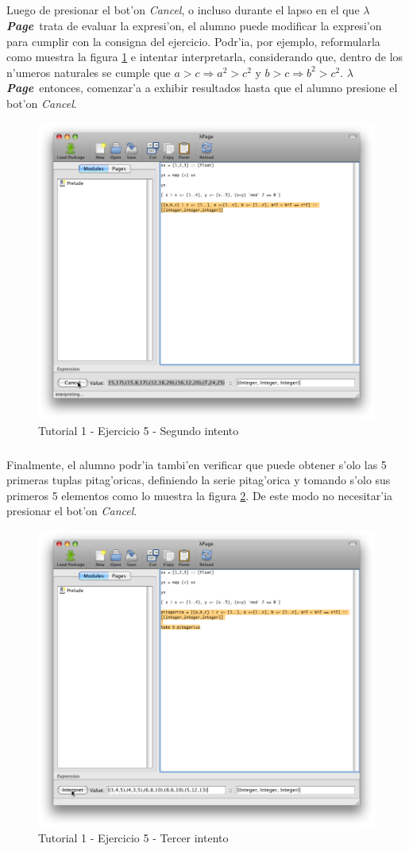 \documentclass[a4paper]{article}
\newcommand{\hpage}{\textbf{\textsl{$\lambda$Page}}}
\begin{document}
\subparagraph{}Luego de presionar el bot'on \textsl{Cancel}, o incluso durante el lapso en el que \hpage\ trata de evaluar la expresi'on, el alumno puede modificar la expresi'on para cumplir con la consigna del ejercicio.  Podr'ia, por ejemplo, reformularla como muestra la figura \ref{tut104} e intentar interpretarla, considerando que, dentro de los n'umeros naturales se cumple que $a > c \Rightarrow a^{2} > c^{2}$ y $b > c \Rightarrow b^{2} > c^{2}$.  \hpage\ entonces, comenzar'a a exhibir resultados hasta que el alumno presione el bot'on \textsl{Cancel}.
\begin{figure}[hp]
	\begin{center}
        	\includegraphics[width=.75\textwidth]{pictures/tut1/04}
		\caption{Tutorial 1 - Ejercicio 5 - Segundo intento}
		\label{tut104}
	\end{center}
\end{figure}
\subparagraph{}Finalmente, el alumno podr'ia tambi'en verificar que puede obtener s'olo las 5 primeras tuplas pitag'oricas, definiendo la serie pitag'orica y tomando s'olo sus primeros 5 elementos como lo muestra la figura \ref{tut105}.  De este modo no necesitar'ia presionar el bot'on \textsl{Cancel}.
\begin{figure}[hp]
	\begin{center}
        	\includegraphics[width=.75\textwidth]{pictures/tut1/05}
		\caption{Tutorial 1 - Ejercicio 5 - Tercer intento}
		\label{tut105}
	\end{center}
\end{figure}
\end{document}
